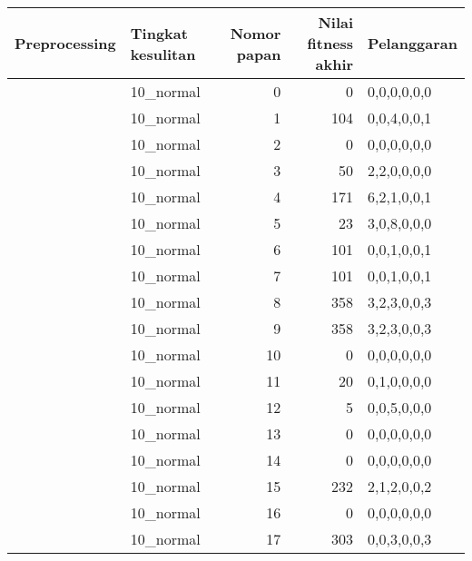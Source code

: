 \begin{tabular}{llrrl}
\hline
 Preprocessing   & Tingkat kesulitan   &   Nomor papan &   Nilai fitness akhir & Pelanggaran   \\
\hline
 [True]          & 10\_normal           &             0 &                     0 & 0,0,0,0,0,0   \\
 [True]          & 10\_normal           &             1 &                   104 & 0,0,4,0,0,1   \\
 [True]          & 10\_normal           &             2 &                     0 & 0,0,0,0,0,0   \\
 [True]          & 10\_normal           &             3 &                    50 & 2,2,0,0,0,0   \\
 [True]          & 10\_normal           &             4 &                   171 & 6,2,1,0,0,1   \\
 [True]          & 10\_normal           &             5 &                    23 & 3,0,8,0,0,0   \\
 [True]          & 10\_normal           &             6 &                   101 & 0,0,1,0,0,1   \\
 [True]          & 10\_normal           &             7 &                   101 & 0,0,1,0,0,1   \\
 [True]          & 10\_normal           &             8 &                   358 & 3,2,3,0,0,3   \\
 [True]          & 10\_normal           &             9 &                   358 & 3,2,3,0,0,3   \\
 [True]          & 10\_normal           &            10 &                     0 & 0,0,0,0,0,0   \\
 [True]          & 10\_normal           &            11 &                    20 & 0,1,0,0,0,0   \\
 [True]          & 10\_normal           &            12 &                     5 & 0,0,5,0,0,0   \\
 [True]          & 10\_normal           &            13 &                     0 & 0,0,0,0,0,0   \\
 [True]          & 10\_normal           &            14 &                     0 & 0,0,0,0,0,0   \\
 [True]          & 10\_normal           &            15 &                   232 & 2,1,2,0,0,2   \\
 [True]          & 10\_normal           &            16 &                     0 & 0,0,0,0,0,0   \\
 [True]          & 10\_normal           &            17 &                   303 & 0,0,3,0,0,3   \\

\end{tabular}
